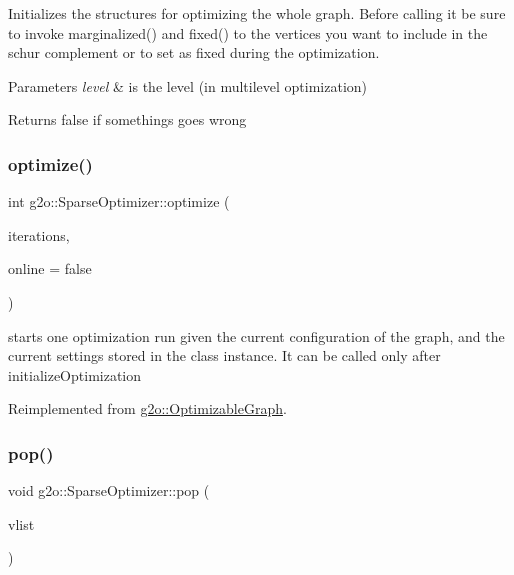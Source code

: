 Initializes the structures for optimizing the whole graph. Before calling it be sure to invoke marginalized() and fixed() to the vertices you want to include in the schur complement or to set as fixed during the optimization. 
\begin{DoxyParams}{Parameters}
{\em level} & is the level (in multilevel optimization) \\
\hline
\end{DoxyParams}
\begin{DoxyReturn}{Returns}
false if somethings goes wrong 
\end{DoxyReturn}
\mbox{\label{classg2o_1_1_sparse_optimizer_a098257ee6f13dbb79be07075244d9930}} 
\subsubsection{\texorpdfstring{optimize()}{optimize()}}
{\footnotesize\ttfamily int g2o\+::\+Sparse\+Optimizer\+::optimize (\begin{DoxyParamCaption}\item[{int}]{iterations,  }\item[{bool}]{online = {\ttfamily false} }\end{DoxyParamCaption})\hspace{0.3cm}{\ttfamily [virtual]}}

starts one optimization run given the current configuration of the graph, and the current settings stored in the class instance. It can be called only after initialize\+Optimization 

Reimplemented from \mbox{\hyperlink{structg2o_1_1_optimizable_graph_ac1b2e36c05680dd3e60ed6f90dddf5d8}{g2o\+::\+Optimizable\+Graph}}.

\mbox{\label{classg2o_1_1_sparse_optimizer_a57dbbb584122c6cfa292bb79d8fcd7ad}} 
\subsubsection{\texorpdfstring{pop()}{pop()}\hspace{0.1cm}{\footnotesize\ttfamily [1/3]}}
{\footnotesize\ttfamily void g2o\+::\+Sparse\+Optimizer\+::pop (\begin{DoxyParamCaption}\item[{\mbox{\hyperlink{classg2o_1_1_hyper_graph_a9339534c99300a0ddac87ba976ef188c}{Sparse\+Optimizer\+::\+Vertex\+Container}} \&}]{vlist }\end{DoxyParamCaption})}



